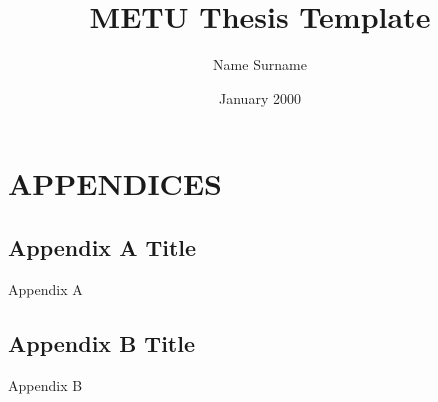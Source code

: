 \documentclass[chaparabic,ceng,ms,12pt,oneandhalf,fivejury]{metu}
\author{Name Surname}
\title{METU Thesis Template}
\date{January 2000}
\begin{document}
\begin{preliminaries}


\end{preliminaries}
%   
% 
%

\setlength{\parindent}{0em}
\setlength{\parskip}{10pt}








%
%

%




\chapter*{APPENDICES}


\renewcommand{\thesection}{\Alph{section}}


\section{Appendix A Title}\label{sec:Appendix_A}

Appendix A 

\newpage
\section{Appendix B Title}\label{sec:Appendix_B}

Appendix B 

\newpage



\newpage



\end{document}
